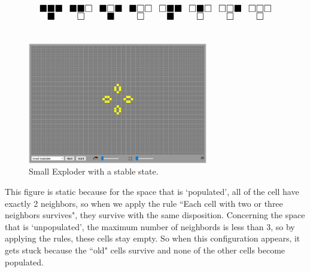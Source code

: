 \documentclass[11pt]{article}
\begin{document}
\[ \LARGE
\substack{\blacksquare \blacksquare \blacksquare \\ \blacksquare} \enspace
\substack{\blacksquare \blacksquare \square \\ \square} \enspace
\substack{\blacksquare \square \blacksquare \\ \blacksquare } \enspace
\substack{\blacksquare \square \square \\ \square} \enspace
\substack{\square \blacksquare \blacksquare \\ \blacksquare} \enspace
\substack{\square \blacksquare \square \\ \square} \enspace
\substack{\square \square \blacksquare \\ \square} \enspace
\substack{\square \square \square \\ \square}
\]

\section{}
\begin{figure}[H]
	\centering
	\includegraphics[width=0.7\textwidth]{images/q6.PNG}
	\caption{Small Exploder with a stable state.}
\end{figure}
This figure is static because for the space that is `populated', all of the cell have exactly 2 neighbors, so when we apply the rule ``Each cell with two or three neighbors survives", they survive with the same disposition.
Concerning the space that is `unpopulated', the maximum number of neighbords is less than 3, so by applying the rules, these cells stay empty. 
So when this configuration appears, it gets stuck because the ``old" cells survive and none of the other cells become populated. 
\end{document}
